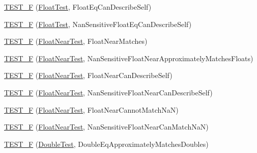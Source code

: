 \begin{DoxyCompactItemize}
\item 
\mbox{\hyperlink{namespacetesting_1_1gmock__matchers__test_a264de01a5019e5c358116845bf5edd14}{T\+E\+S\+T\+\_\+F}} (\mbox{\hyperlink{namespacetesting_1_1gmock__matchers__test_a145329e433869625f9f0e98a0cdfd7b4}{Float\+Test}}, Float\+Eq\+Can\+Describe\+Self)
\item 
\mbox{\hyperlink{namespacetesting_1_1gmock__matchers__test_a95a2bbc273ff70fc364c5c9c4697834c}{T\+E\+S\+T\+\_\+F}} (\mbox{\hyperlink{namespacetesting_1_1gmock__matchers__test_a145329e433869625f9f0e98a0cdfd7b4}{Float\+Test}}, Nan\+Sensitive\+Float\+Eq\+Can\+Describe\+Self)
\item 
\mbox{\hyperlink{namespacetesting_1_1gmock__matchers__test_a6897409da5003f20f891d8a5ecabdc99}{T\+E\+S\+T\+\_\+F}} (\mbox{\hyperlink{namespacetesting_1_1gmock__matchers__test_a426b51f464dcb48033946e1bf3cc8795}{Float\+Near\+Test}}, Float\+Near\+Matches)
\item 
\mbox{\hyperlink{namespacetesting_1_1gmock__matchers__test_ad396e996ed685fd80cbd78740b8d01a8}{T\+E\+S\+T\+\_\+F}} (\mbox{\hyperlink{namespacetesting_1_1gmock__matchers__test_a426b51f464dcb48033946e1bf3cc8795}{Float\+Near\+Test}}, Nan\+Sensitive\+Float\+Near\+Approximately\+Matches\+Floats)
\item 
\mbox{\hyperlink{namespacetesting_1_1gmock__matchers__test_ad56232046efe7b4d5169a15fd15a2001}{T\+E\+S\+T\+\_\+F}} (\mbox{\hyperlink{namespacetesting_1_1gmock__matchers__test_a426b51f464dcb48033946e1bf3cc8795}{Float\+Near\+Test}}, Float\+Near\+Can\+Describe\+Self)
\item 
\mbox{\hyperlink{namespacetesting_1_1gmock__matchers__test_a4e90d53ea578d6b767559d8615a4c0c2}{T\+E\+S\+T\+\_\+F}} (\mbox{\hyperlink{namespacetesting_1_1gmock__matchers__test_a426b51f464dcb48033946e1bf3cc8795}{Float\+Near\+Test}}, Nan\+Sensitive\+Float\+Near\+Can\+Describe\+Self)
\item 
\mbox{\hyperlink{namespacetesting_1_1gmock__matchers__test_a2cd2ceebefa14a5d564a3bca60ed6572}{T\+E\+S\+T\+\_\+F}} (\mbox{\hyperlink{namespacetesting_1_1gmock__matchers__test_a426b51f464dcb48033946e1bf3cc8795}{Float\+Near\+Test}}, Float\+Near\+Cannot\+Match\+NaN)
\item 
\mbox{\hyperlink{namespacetesting_1_1gmock__matchers__test_ae7521865828fba53b45cc2819bec1273}{T\+E\+S\+T\+\_\+F}} (\mbox{\hyperlink{namespacetesting_1_1gmock__matchers__test_a426b51f464dcb48033946e1bf3cc8795}{Float\+Near\+Test}}, Nan\+Sensitive\+Float\+Near\+Can\+Match\+NaN)
\item 
\mbox{\hyperlink{namespacetesting_1_1gmock__matchers__test_a1b33dc485faca8c69184f3feb0476290}{T\+E\+S\+T\+\_\+F}} (\mbox{\hyperlink{namespacetesting_1_1gmock__matchers__test_a944cdd366ed240f29ae8e3ebc753ad5c}{Double\+Test}}, Double\+Eq\+Approximately\+Matches\+Doubles)

\end{DoxyCompactItemize}
